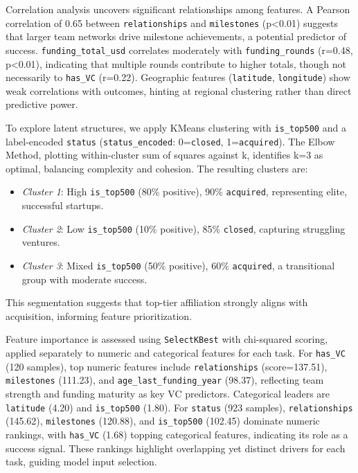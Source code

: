 \documentclass[conference]{IEEEtran}
\begin{document}
    Correlation analysis uncovers significant relationships among features. A Pearson correlation of 0.65 between \texttt{relationships} and \texttt{milestones} (p<0.01) suggests that larger team networks drive milestone achievements, a potential predictor of success. \texttt{funding\_total\_usd} correlates moderately with \texttt{funding\_rounds} (r=0.48, p<0.01), indicating that multiple rounds contribute to higher totals, though not necessarily to \texttt{has\_VC} (r=0.22). Geographic features (\texttt{latitude}, \texttt{longitude}) show weak correlations with outcomes, hinting at regional clustering rather than direct predictive power.

    To explore latent structures, we apply KMeans clustering with \texttt{is\_top500} and a label-encoded \texttt{status} (\texttt{status\_encoded}: 0=\texttt{closed}, 1=\texttt{acquired}). The Elbow Method, plotting within-cluster sum of squares against k, identifies k=3 as optimal, balancing complexity and cohesion. The resulting clusters are:
    \begin{itemize}
        \item \textit{Cluster 1}: High \texttt{is\_top500} (80\% positive), 90\% \texttt{acquired}, representing elite, successful startups.
        \item \textit{Cluster 2}: Low \texttt{is\_top500} (10\% positive), 85\% \texttt{closed}, capturing struggling ventures.
        \item \textit{Cluster 3}: Mixed \texttt{is\_top500} (50\% positive), 60\% \texttt{acquired}, a transitional group with moderate success.
    \end{itemize}
    This segmentation suggests that top-tier affiliation strongly aligns with acquisition, informing feature prioritization.

    Feature importance is assessed using \texttt{SelectKBest} with chi-squared scoring, applied separately to numeric and categorical features for each task. For \texttt{has\_VC} (120 samples), top numeric features include \texttt{relationships} (score=137.51), \texttt{milestones} (111.23), and \texttt{age\_last\_funding\_year} (98.37), reflecting team strength and funding maturity as key VC predictors. Categorical leaders are \texttt{latitude} (4.20) and \texttt{is\_top500} (1.80). For \texttt{status} (923 samples), \texttt{relationships} (145.62), \texttt{milestones} (120.88), and \texttt{is\_top500} (102.45) dominate numeric rankings, with \texttt{has\_VC} (1.68) topping categorical features, indicating its role as a success signal. These rankings highlight overlapping yet distinct drivers for each task, guiding model input selection.
\end{document}
